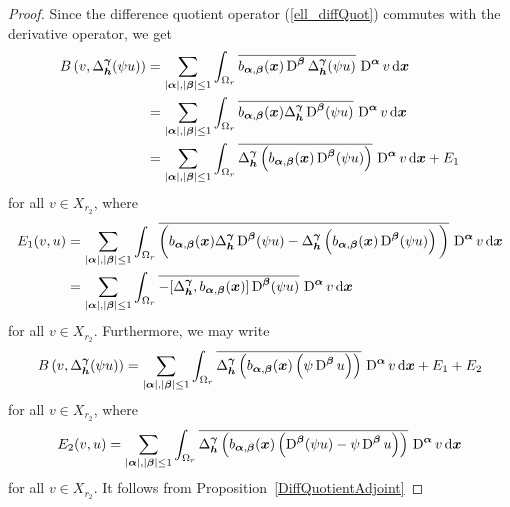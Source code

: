 \begin{proof}
Since the difference quotient operator (\ref{ell_diffQuot}) commutes
with the derivative operator, we get
\begin{align*}
B\left(v,\Delta_{{\bm{h}}}^{{\bm{\gamma}}}(\psi u)\right)
& = \sum_{|{\bm{\alpha}}|,|{\bm{\beta}}|\leq 1}
\int_{\Omega_r} \overline{b_{{\bm{\alpha}},{\bm{\beta}}}({\bm{x}})
\operatorname{D}^{{\bm{\beta}}} \Delta_{{\bm{h}}}^{{\bm{\gamma}}}(\psi u)}\,
\operatorname{D}^{{\bm{\alpha}}} v \,\mathrm{d}{{\bm{x}}} \\
& = \sum_{|{\bm{\alpha}}|,|{\bm{\beta}}|\leq 1}
\int_{\Omega_r} \overline{b_{{\bm{\alpha}},{\bm{\beta}}}({\bm{x}})
\Delta_{{\bm{h}}}^{{\bm{\gamma}}} \operatorname{D}^{{\bm{\beta}}} (\psi u)}\,
\operatorname{D}^{{\bm{\alpha}}} v \,\mathrm{d}{{\bm{x}}} \\
& = \sum_{|{\bm{\alpha}}|,|{\bm{\beta}}|\leq 1}
\int_{\Omega_r} \overline{
\Delta_{{\bm{h}}}^{{\bm{\gamma}}} \left(b_{{\bm{\alpha}},{\bm{\beta}}}({\bm{x}})
\operatorname{D}^{{\bm{\beta}}} (\psi u)\right)} \, \operatorname{D}^{{\bm{\alpha}}} v \,\mathrm{d}{{\bm{x}}} + E_1
\end{align*}
for all $v \in X_{r_2}$, where
\begin{align*}
E_1(v,u) &= \sum_{|{\bm{\alpha}}|,|{\bm{\beta}}|\leq 1}
\int_{\Omega_r} \overline{\bigg( b_{{\bm{\alpha}},{\bm{\beta}}}({\bm{x}})
\Delta_{{\bm{h}}}^{{\bm{\gamma}}} \operatorname{D}^{{\bm{\beta}}} (\psi u) - 
\Delta_{{\bm{h}}}^{{\bm{\gamma}}} \left(b_{{\bm{\alpha}},{\bm{\beta}}}({\bm{x}})
\operatorname{D}^{{\bm{\beta}}} (\psi u)\right)\bigg)} \,
\operatorname{D}^{{\bm{\alpha}}} v \,\mathrm{d}{{\bm{x}}} \\
&= \sum_{|{\bm{\alpha}}|,|{\bm{\beta}}|\leq 1}
\int_{\Omega_r} \overline{-[\Delta_{{\bm{h}}}^{{\bm{\gamma}}},
b_{{\bm{\alpha}},{\bm{\beta}}}({\bm{x}})]
\operatorname{D}^{{\bm{\beta}}} (\psi u) }\, \operatorname{D}^{{\bm{\alpha}}} v \,\mathrm{d}{{\bm{x}}}
\end{align*}
for all $v \in X_{r_2}$.
Furthermore, we may write
\begin{equation} \label{ell_RB_foot}
B\left(v,\Delta_{{\bm{h}}}^{{\bm{\gamma}}}(\psi u)\right)
= \sum_{|{\bm{\alpha}}|,|{\bm{\beta}}|\leq 1}
\int_{\Omega_r} \overline{
\Delta_{{\bm{h}}}^{{\bm{\gamma}}} \left(b_{{\bm{\alpha}},{\bm{\beta}}}({\bm{x}})
\left( \psi \operatorname{D}^{{\bm{\beta}}} u\right) \right)} \,
\operatorname{D}^{{\bm{\alpha}}} v \,\mathrm{d}{{\bm{x}}} + E_1 + E_2
\end{equation}
for all $v \in X_{r_2}$,
where
\[
E_2(v,u) = \sum_{|{\bm{\alpha}}|,|{\bm{\beta}}|\leq 1}
\int_{\Omega_r} \overline{
\Delta_{{\bm{h}}}^{{\bm{\gamma}}} \left(b_{{\bm{\alpha}},{\bm{\beta}}}({\bm{x}})
\left(\operatorname{D}^{{\bm{\beta}}}( \psi u) - \psi \operatorname{D}^{{\bm{\beta}}} u\right) \right)}
\, \operatorname{D}^{{\bm{\alpha}}} v \,\mathrm{d}{{\bm{x}}}
\]
for all $v \in X_{r_2}$.  It follows from Proposition~\ref{DiffQuotientAdjoint}

\end{proof}
